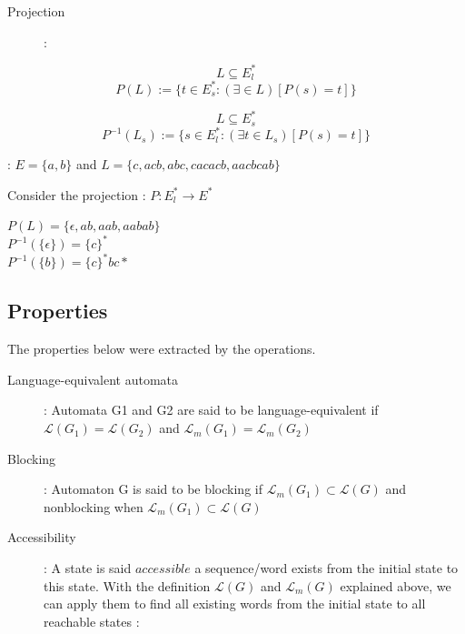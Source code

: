 \begin{description}
\item [Projection] : 
\end{description}

\begin{equation*}
L \subseteq E_l^*
\end{equation*}
\begin{equation*}
P(L) :=\{ t \in E_s^* : (\exists \in L) [P(s)=t] \}
\end{equation*}

\begin{equation*}
L \subseteq E_s^*
\end{equation*}
\begin{equation*}
P^{-1}(L_s) := \{ s \in E_l^* : (\exists t \in L_s) [P(s)=t] \}
\end{equation*}

\begin{description}
\item [Example of operations for Languages] : $E=\{a,b\}$ and $L =\{c, acb, abc, cacacb, aacbcab\}$
\item\hspace{6.6cm} Consider the projection : $ P: E_l^* \rightarrow E^*$\\
\end{description}

\begin{center}
$P(L) = \{ \epsilon, ab, aab, aabab\}$ \\
$P^{-1}(\{\epsilon\}) = \{c\}^*$\\
$P^{-1}(\{b\}) = \{c\}^*{b}{c}*$
\end{center}



\subsection{Properties}
The properties below were extracted by the operations.
\begin{description}
\item [Language-equivalent automata \cite{cassandras2009introduction} ] : Automata G1 and G2 are said to be language-equivalent if
$\mathcal{L}(G_1) = \mathcal{L}(G_2)$ and $\mathcal{L}_m(G_1) = \mathcal{L}_m(G_2)$ \\

\item [Blocking] : Automaton G is said to be blocking if $ \mathcal{L}_m(G_1) \subset\mathcal{L}(G) $
and nonblocking when $ \mathcal{L}_m(G_1) \subset \mathcal{L}(G) $

\item [Accessibility] : A state is said $accessible$ a sequence/word exists from the initial state to this state. With the definition $\mathcal{L}(G)$ and $\mathcal{L}_m(G)$ explained above, we can apply them to find all existing words from the initial state to all reachable states :
\end{description}


